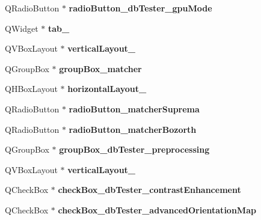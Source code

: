 \begin{DoxyCompactItemize}
Q\+Radio\+Button $\ast$ {\bfseries radio\+Button\+\_\+db\+Tester\+\_\+gpu\+Mode}
\item 
\mbox{\label{class_ui___main_window_a7d8a29446578759800fab35c698b6be2}} 
Q\+Widget $\ast$ {\bfseries tab\+\_}
\item 
\mbox{\label{class_ui___main_window_a5be0d9ce4711143a3bb605cb75dada9d}} 
Q\+V\+Box\+Layout $\ast$ {\bfseries vertical\+Layout\+\_}
\item 
\mbox{\label{class_ui___main_window_a0d65a611e7dfbd86d6296ac98600ab73}} 
Q\+Group\+Box $\ast$ {\bfseries group\+Box\+\_\+matcher}
\item 
\mbox{\label{class_ui___main_window_a9ab91d59aada4ff82309b36c9d5a0fa6}} 
Q\+H\+Box\+Layout $\ast$ {\bfseries horizontal\+Layout\+\_}
\item 
\mbox{\label{class_ui___main_window_a73edea02461c6f0c9dd964955a6b909c}} 
Q\+Radio\+Button $\ast$ {\bfseries radio\+Button\+\_\+matcher\+Suprema}
\item 
\mbox{\label{class_ui___main_window_af195e539d3d49648bc12a79be2841c68}} 
Q\+Radio\+Button $\ast$ {\bfseries radio\+Button\+\_\+matcher\+Bozorth}
\item 
\mbox{\label{class_ui___main_window_a2481fde4167eb06d04d073c8d9473871}} 
Q\+Group\+Box $\ast$ {\bfseries group\+Box\+\_\+db\+Tester\+\_\+preprocessing}
\item 
\mbox{\label{class_ui___main_window_ad10ed00e1ba5ba3f2baff0e0e024de70}} 
Q\+V\+Box\+Layout $\ast$ {\bfseries vertical\+Layout\+\_}
\item 
\mbox{\label{class_ui___main_window_a98b2f0830fbfcdc5f1c18f6b23022210}} 
Q\+Check\+Box $\ast$ {\bfseries check\+Box\+\_\+db\+Tester\+\_\+contrast\+Enhancement}
\item 
\mbox{\label{class_ui___main_window_a7ca820f1a5ecb10fcb865cd8462f2e13}} 
Q\+Check\+Box $\ast$ {\bfseries check\+Box\+\_\+db\+Tester\+\_\+advanced\+Orientation\+Map}

\end{DoxyCompactItemize}
